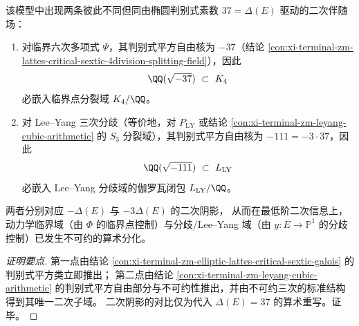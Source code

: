 \begin{conclusion}\label{con:xi-terminal-zm-quadratic-companion-fields-separation}
该模型中出现两条彼此不同但同由椭圆判别式素数 \(37=\Delta(E)\) 驱动的二次伴随场：
\begin{enumerate}
  \item 对临界六次多项式 \(\Psi\)，其判别式平方自由核为 \(-37\)（结论 \ref{con:xi-terminal-zm-lattes-critical-sextic-4division-splitting-field}），因此
  \[
  \QQ(\sqrt{-37})\ \subset\ K_4
  \]
  必嵌入临界点分裂域 \(K_4/\QQ\)。
  \item 对 Lee--Yang 三次分歧（等价地，对 \(P_{\mathrm{LY}}\) 或结论 \ref{con:xi-terminal-zm-leyang-cubic-arithmetic} 的 \(S_3\) 分裂域），其判别式平方自由核为 \(-111=-3\cdot 37\)，因此
  \[
  \QQ(\sqrt{-111})\ \subset\ L_{\mathrm{LY}}
  \]
  必嵌入 Lee--Yang 分歧域的伽罗瓦闭包 \(L_{\mathrm{LY}}/\QQ\)。
\end{enumerate}
两者分别对应 \(-\Delta(E)\) 与 \(-3\Delta(E)\) 的二次阴影，
从而在最低阶二次信息上，动力学临界域（由 \(\Phi\) 的临界点控制）与分歧/Lee--Yang 域（由 \(y:E\to\mathbb P^{1}\) 的分歧控制）已发生不可约的算术分化。
\end{conclusion}
\begin{proof}[证明要点]
第一点由结论 \ref{con:xi-terminal-zm-elliptic-lattes-critical-sextic-galois} 的判别式平方类立即推出；
第二点由结论 \ref{con:xi-terminal-zm-leyang-cubic-arithmetic} 的判别式平方自由部分与不可约性推出，并由不可约三次的标准结构得到其唯一二次子域。
二次阴影的对比仅为代入 \(\Delta(E)=37\) 的算术重写。证毕。
\end{proof}

